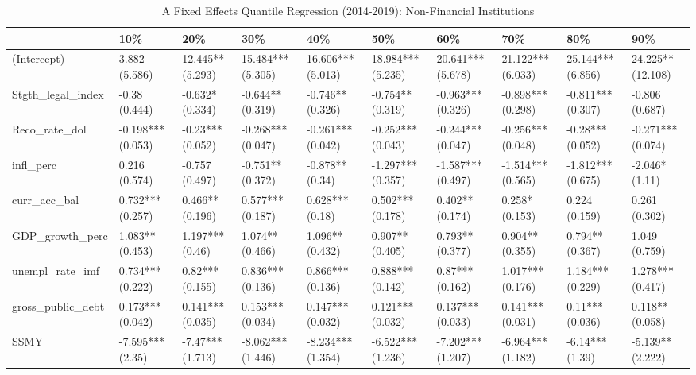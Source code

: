 \begin{table}[ht]
\centering
\caption{A Fixed Effects Quantile Regression (2014-2019): Non-Financial Institutions} 
\begingroup\small
\begin{tabular}{llllllllll}
  \toprule
 & 10\% & 20\% & 30\% & 40\% & 50\% & 60\% & 70\% & 80\% & 90\% \\ 
  \midrule
(Intercept) & 3.882 (5.586) & 12.445** (5.293) & 15.484*** (5.305) & 16.606*** (5.013) & 18.984*** (5.235) & 20.641*** (5.678) & 21.122*** (6.033) & 25.144*** (6.856) & 24.225** (12.108) \\ 
  Stgth\_legal\_index & -0.38 (0.444) & -0.632* (0.334) & -0.644** (0.319) & -0.746** (0.326) & -0.754** (0.319) & -0.963*** (0.326) & -0.898*** (0.298) & -0.811*** (0.307) & -0.806 (0.687) \\ 
  Reco\_rate\_dol & -0.198*** (0.053) & -0.23*** (0.052) & -0.268*** (0.047) & -0.261*** (0.042) & -0.252*** (0.043) & -0.244*** (0.047) & -0.256*** (0.048) & -0.28*** (0.052) & -0.271*** (0.074) \\ 
  infl\_perc & 0.216 (0.574) & -0.757 (0.497) & -0.751** (0.372) & -0.878** (0.34) & -1.297*** (0.357) & -1.587*** (0.497) & -1.514*** (0.565) & -1.812*** (0.675) & -2.046* (1.11) \\ 
  curr\_acc\_bal & 0.732*** (0.257) & 0.466** (0.196) & 0.577*** (0.187) & 0.628*** (0.18) & 0.502*** (0.178) & 0.402** (0.174) & 0.258* (0.153) & 0.224 (0.159) & 0.261 (0.302) \\ 
  GDP\_growth\_perc & 1.083** (0.453) & 1.197*** (0.46) & 1.074** (0.466) & 1.096** (0.432) & 0.907** (0.405) & 0.793** (0.377) & 0.904** (0.355) & 0.794** (0.367) & 1.049 (0.759) \\ 
  unempl\_rate\_imf & 0.734*** (0.222) & 0.82*** (0.155) & 0.836*** (0.136) & 0.866*** (0.136) & 0.888*** (0.142) & 0.87*** (0.162) & 1.017*** (0.176) & 1.184*** (0.229) & 1.278*** (0.417) \\ 
  gross\_public\_debt & 0.173*** (0.042) & 0.141*** (0.035) & 0.153*** (0.034) & 0.147*** (0.032) & 0.121*** (0.032) & 0.137*** (0.033) & 0.141*** (0.031) & 0.11*** (0.036) & 0.118** (0.058) \\ 
  SSMY & -7.595*** (2.35) & -7.47*** (1.713) & -8.062*** (1.446) & -8.234*** (1.354) & -6.522*** (1.236) & -7.202*** (1.207) & -6.964*** (1.182) & -6.14*** (1.39) & -5.139** (2.222) \\ 
   \bottomrule
\end{tabular}
\endgroup
\end{table}
